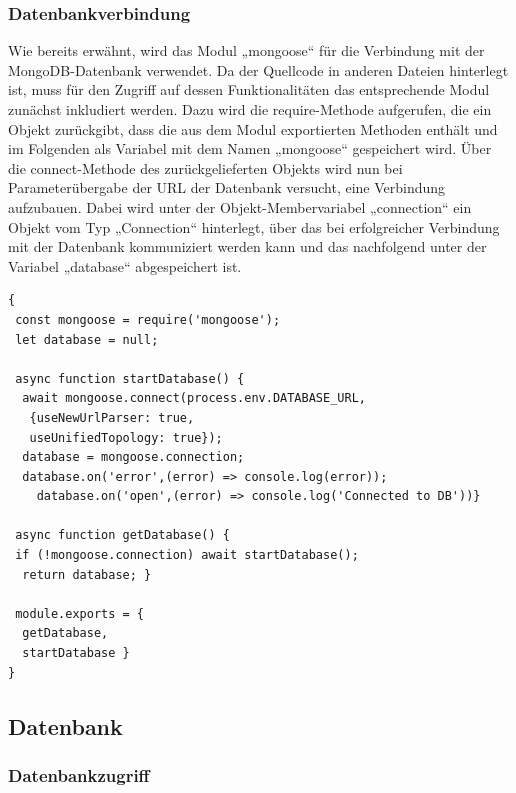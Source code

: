 \subsubsection{Datenbankverbindung}
Wie bereits erwähnt, wird das Modul „mongoose“ für die Verbindung mit der MongoDB-Datenbank verwendet. 
Da der Quellcode in anderen Dateien hinterlegt ist, muss für den Zugriff auf dessen Funktionalitäten das entsprechende Modul zunächst inkludiert werden. Dazu wird die require-Methode aufgerufen, die ein Objekt zurückgibt, dass die aus dem Modul exportierten Methoden enthält und im Folgenden als Variabel mit dem Namen „mongoose“ gespeichert wird. 
\newline
Über die connect-Methode des zurückgelieferten Objekts wird nun bei Parameterübergabe der URL der Datenbank versucht, eine Verbindung aufzubauen.  
Dabei wird unter der Objekt-Membervariabel  „connection“ ein Objekt vom Typ „Connection“ hinterlegt, über das bei erfolgreicher Verbindung mit der Datenbank kommuniziert werden kann und das nachfolgend unter der Variabel „database“ abgespeichert ist. 

\begin{lstlisting}[caption=Verbindung zur MongoDB-Datenbank, label=lst:mongodbconnection]
{
 const mongoose = require('mongoose');
 let database = null;

 async function startDatabase() {
  await mongoose.connect(process.env.DATABASE_URL, 
   {useNewUrlParser: true,
   useUnifiedTopology: true}); 
  database = mongoose.connection;
  database.on('error',(error) => console.log(error));
  	database.on('open',(error) => console.log('Connected to DB'))}

 async function getDatabase() {
 if (!mongoose.connection) await startDatabase();
  return database; }

 module.exports = {
  getDatabase,
  startDatabase }
}
\end{lstlisting}

\subsection{Datenbank}


\subsubsection{Datenbankzugriff}                   


